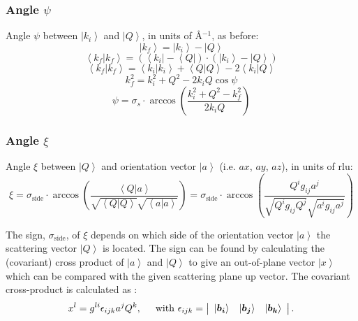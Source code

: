 \subsubsection*{Angle $\psi$}
Angle $\psi$ between $\left| k_i \right>$ and $\left| Q \right>$, in units of \AA{}$^{-1}$, as before:
\begin{equation}
	\left| k_f \right> = \left| k_i \right> - \left| Q \right> 
\end{equation}
\begin{equation} 
	\left< k_f | k_f \right> = \left( \left< k_i \right| - \left< Q \right| \right) \cdot \left( \left| k_i \right> - \left| Q \right> \right)
\end{equation}
\begin{equation}
	\left< k_f | k_f \right> = \left< k_i | k_i \right> + \left< Q | Q \right> - 2 \left< k_i | Q \right>
\end{equation}
\begin{equation}
	k_f^2 = k_i^2 + Q^2 - 2 k_i Q \cos \psi 
\end{equation}
\begin{equation}
	\boxed{ \psi = \sigma_s \cdot \arccos \left( \frac{k_i^2 + Q^2 - k_f^2}{2 k_i Q} \right) }
\end{equation}


\subsubsection*{Angle $\xi$}
Angle $\xi$ between $\left| Q \right>$ and orientation vector $\left| a \right>$ (i.e. $ax$, $ay$, $az$), in units of rlu:
\begin{equation} 
	\boxed{ \xi = 
\sigma_{\mathrm{side}} \cdot \arccos \left( \frac{ \left< Q | a \right> }{ \sqrt{\left< Q | Q \right>} \sqrt{\left< a | a \right>} } \right) = 
\sigma_{\mathrm{side}} \cdot \arccos \left( \frac{ Q^i g_{ij} a^j }{ \sqrt{Q^i g_{ij} Q^j} \sqrt{a^i g_{ij} a^j} } \right) } 
\end{equation}

The sign, $\sigma_{\mathrm{side}}$, of $\xi$ depends on which side of the orientation vector $\left| a \right>$ 
the scattering vector $\left| Q \right>$ is located. 
The sign can be found by calculating the (covariant) cross product of $\left| a \right>$ and $\left| Q \right>$ 
to give an out-of-plane vector $\left| x \right>$ which can be compared with the given scattering plane up vector. 
The covariant cross-product is calculated as \cite[p. 815]{Arens2015}:
\begin{equation}
	x^l = g^{li} \epsilon_{ijk} a^j Q^k, \hspace{0.5cm} \mathrm{with} \ 
	\epsilon_{ijk} = \left|
		\begin{array}{ccc} \left| 
			\bm{b_i} \right> & \left| \bm{b_j} \right> & \left| \bm{b_k} \right>
		\end{array} \right|.
\end{equation}


